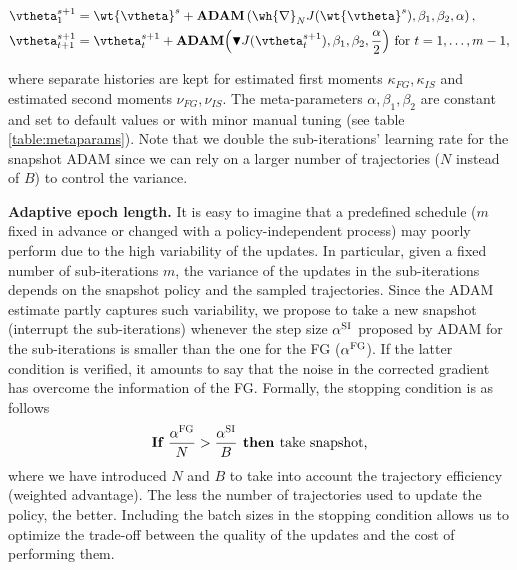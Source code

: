 \begin{align*}
\vtheta^{s+1}_1 &= \wt{\vtheta}^s + \textbf{ADAM}\left(\wh{\nabla}_N J(\wt{\vtheta}^s),\beta_1,\beta_2,\alpha\right),\\
\vtheta^{s+1}_{t+1} &= \vtheta^{s+1}_t + \textbf{ADAM}\Big( 
\blacktriangledown J(\vtheta^{s+1}_t),\beta_1,\beta_2,\frac{\alpha}{2}\Big)
\text{ for $t=1,\dots,m-1$},
\end{align*}

where separate histories are kept for estimated first moments $\kappa_{FG},\kappa_{IS}$ and estimated second moments $\nu_{FG},\nu_{IS}$.
The meta-parameters $\alpha,\beta_1,\beta_2$ are constant and set to default values or with minor manual tuning (see table \ref{table:metaparams}). Note that we double the sub-iterations' learning rate for the snapshot \acs{ADAM} since we can rely on a larger number of trajectories ($N$ instead of $B$) to control the variance.

\textbf{Adaptive epoch length.}
It is easy to imagine that a predefined schedule (\eg $m$ fixed in advance or changed with a policy-independent process) may poorly perform due to the high variability of the updates.
In particular, given a fixed number of sub-iterations $m$, the variance of the updates in the sub-iterations depends on the snapshot policy and the sampled trajectories.
Since the \acs{ADAM} estimate partly captures such variability,  we propose to take a new snapshot (\ie interrupt the sub-iterations) whenever the step size $\alpha^{\textsc{SI}}$ proposed by \acs{ADAM} for the sub-iterations is smaller than the one for the \acs{FG} (\ie $\alpha^{\textsc{FG}}$).
If the latter condition is verified, it amounts to say that the noise in the corrected gradient has overcome the information of the \acs{FG}.
Formally, the stopping condition is as follows
\[
\textbf{If }        \frac{\alpha^{\textsc{FG}}}{N} > \frac{\alpha^{\textsc{SI}}}{B} \textbf{ then } \text{take snapshot,}
\]
where we have introduced $N$ and $B$ to take into account the trajectory efficiency (\ie weighted advantage).
The less the number of trajectories used to update the policy, the better.
Including the batch sizes in the stopping condition allows us to optimize the trade-off between the quality of the updates and the cost of performing them.

\vspace{-0.05in}
